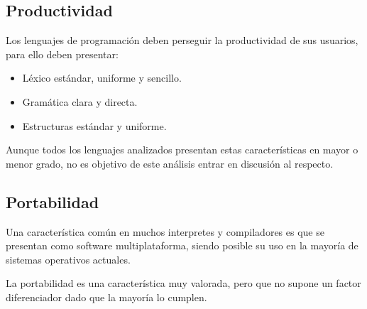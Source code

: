 \subsection{Productividad}
Los lenguajes de programación deben perseguir la productividad de sus usuarios, para ello deben presentar: 
\begin{itemize}
\item Léxico estándar, uniforme y sencillo.
\item Gramática clara y directa.
\item Estructuras estándar y uniforme.
\end{itemize}

Aunque todos los lenguajes analizados presentan estas características en mayor o menor grado, no es objetivo 
de este análisis entrar en discusión al respecto.

\subsection{Portabilidad}
Una característica común en muchos interpretes y compiladores es que se presentan como software multiplataforma,
siendo posible su uso en la mayoría de sistemas operativos actuales. 

La portabilidad es una característica muy valorada, pero que no supone un factor diferenciador dado que la mayoría 
lo cumplen. 
